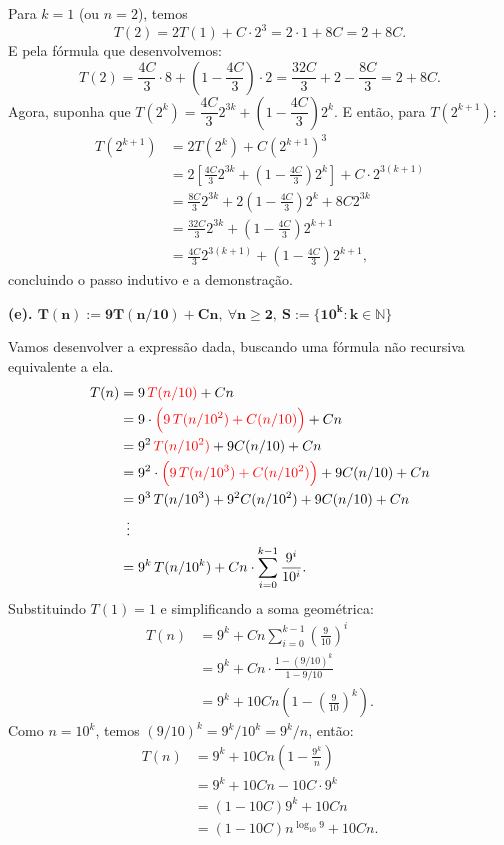 \documentclass[a4paper]{article}
\begin{document}
Para $k=1$ (ou $n=2$), temos
\[ T(2) = 2T(1) + C \cdot 2^3 = 2 \cdot 1 + 8C = 2 + 8C. \]
E pela fórmula que desenvolvemos:
\[
T(2) = \frac{4C}{3} \cdot 8 + \left(1 - \frac{4C}{3}\right) \cdot 2 = \frac{32C}{3} + 2 - \frac{8C}{3} = 2 + 8C.
\]
Agora, suponha que $T(2^k) = \dfrac{4C}{3} 2^{3k} + \left(1 - \dfrac{4C}{3}\right) 2^k$.
E então, para $T(2^{k+1})$:
\begin{align*}
T(2^{k+1}) &= 2T(2^k) + C(2^{k+1})^3 \\
&= 2\left[\frac{4C}{3} 2^{3k} + \left(1 - \frac{4C}{3}\right) 2^k \right] + C \cdot 2^{3(k+1)} \\
&= \frac{8C}{3} 2^{3k} + 2 \left(1 - \frac{4C}{3}\right) 2^k + 8C 2^{3k} \\
&= \frac{32C}{3} 2^{3k} + \left(1 - \frac{4C}{3}\right) 2^{k+1} \\
&= \frac{4C}{3} 2^{3(k+1)} + \left(1 - \frac{4C}{3}\right) 2^{k+1},
\end{align*}
concluindo o passo indutivo e a demonstração.

\newpage

\textbf{(e). $\bm{T(n) := 9T(n/10) + Cn, \: \forall n \ge 2, \: S:= \{ 10^k : k \in \mathbb N \}}$}

Vamos desenvolver a expressão dada, buscando uma fórmula não recursiva equivalente a ela.
\begin{align*}
    T(n) & = 9 \, \color{red} T(n/10) \color{black} + Cn \\
    & = 9 \cdot \color{red} \Big( 9 \, T(n/10^2) + C(n/10) \Big) \color{black} + Cn \\
    & = 9^2 \, \color{red} T(n/10^2) \color{black} + 9C(n/10) + Cn \\
    & = 9^2 \cdot \color{red} \Big( 9 \, T(n/10^3) + C(n/10^2) \Big) \color{black} + 9C(n/10) + Cn \\
    & = 9^3 \, T(n/10^3) + 9^2C(n/10^2) + 9C(n/10) + Cn \\
    & \: \; \vdots \\
    & = 9^k \, T(n/10^k) + Cn \cdot \sum_{i=0}^{k-1} \frac {9^i}{10^i}.
\end{align*}
Substituindo $T(1)=1$ e simplificando a soma geométrica:
\begin{align*}
    T(n) &= 9^k + Cn \sum_{i=0}^{k-1} \left(\frac{9}{10}\right)^i \\
    &= 9^k + Cn \cdot \frac{1 - (9/10)^k}{1 - 9/10} \\
    &= 9^k + 10Cn \left(1 - \left(\frac{9}{10}\right)^k \right).
\end{align*}
Como $n = 10^k$, temos $(9/10)^k = 9^k / 10^k = 9^k / n$, então:
\begin{align*}
    T(n) &= 9^k + 10Cn \left(1 - \frac{9^k}{n} \right) \\
    &= 9^k + 10Cn - 10C \cdot 9^k \\
    &= (1 - 10C) 9^k + 10Cn \\
    &= (1 - 10C) n^{\log_{10} 9} + 10Cn.
\end{align*}
\end{document}
